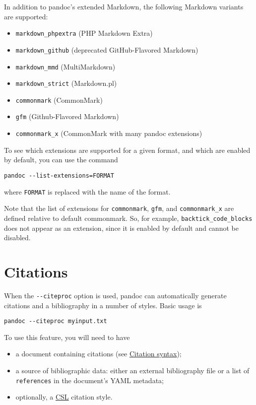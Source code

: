\documentclass[
  a4paper,
]{article}
\providecommand{\tightlist}{%
  \setlength{\itemsep}{0pt}\setlength{\parskip}{0pt}}
\begin{document}
In addition to pandoc's extended Markdown, the following Markdown
variants are supported:

\begin{itemize}
\tightlist
\item
  \texttt{markdown\_phpextra} (PHP Markdown Extra)
\item
  \texttt{markdown\_github} (deprecated GitHub-Flavored Markdown)
\item
  \texttt{markdown\_mmd} (MultiMarkdown)
\item
  \texttt{markdown\_strict} (Markdown.pl)
\item
  \texttt{commonmark} (CommonMark)
\item
  \texttt{gfm} (Github-Flavored Markdown)
\item
  \texttt{commonmark\_x} (CommonMark with many pandoc extensions)
\end{itemize}

To see which extensions are supported for a given format, and which are
enabled by default, you can use the command

\begin{verbatim}
pandoc --list-extensions=FORMAT
\end{verbatim}

where \texttt{FORMAT} is replaced with the name of the format.

Note that the list of extensions for \texttt{commonmark}, \texttt{gfm},
and \texttt{commonmark\_x} are defined relative to default commonmark.
So, for example, \texttt{backtick\_code\_blocks} does not appear as an
extension, since it is enabled by default and cannot be disabled.

\hypertarget{citations}{%
\section{Citations}\label{citations}}

When the \texttt{-\/-citeproc} option is used, pandoc can automatically
generate citations and a bibliography in a number of styles. Basic usage
is

\begin{verbatim}
pandoc --citeproc myinput.txt
\end{verbatim}

To use this feature, you will need to have

\begin{itemize}
\tightlist
\item
  a document containing citations (see
  \protect\hyperlink{citation-syntax}{Citation syntax});
\item
  a source of bibliographic data: either an external bibliography file
  or a list of \texttt{references} in the document's YAML metadata;
\item
  optionally, a
  \href{https://docs.citationstyles.org/en/stable/specification.html}{CSL}
  citation style.
\end{itemize}
\end{document}
